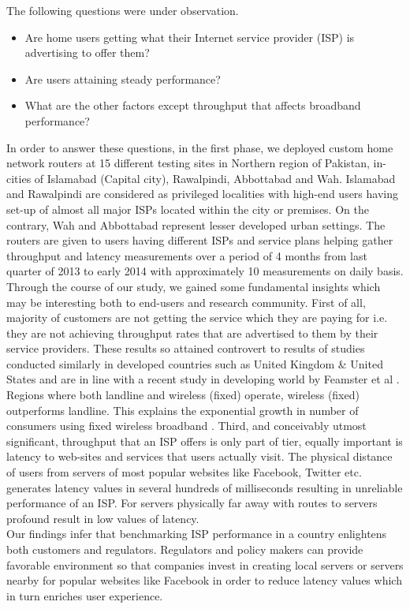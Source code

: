 \documentclass{sig-alternate-10pt}
\begin{document}
\indent The following questions were under observation.
\begin{itemize}
  \item Are home users getting what their Internet service provider (ISP) is advertising to offer them?
  \item Are users attaining steady performance?
  \item What are the other factors except throughput that affects broadband performance?
\end{itemize}
\indent In order to answer these questions, in the first phase, we deployed custom home network routers at 15 different testing sites in Northern region of Pakistan, in-cities of Islamabad (Capital city), Rawalpindi, Abbottabad and Wah. Islamabad and Rawalpindi are considered as privileged localities with high-end users having set-up of almost all major ISPs located within the city or premises. On the contrary, Wah and Abbottabad represent lesser developed urban settings. The routers are given to users having different ISPs and service plans helping gather throughput and latency measurements over a period of 4 months from last quarter of 2013 to early 2014 with approximately 10 measurements on daily basis. \\
\indent Through the course of our study, we gained some fundamental insights which may be interesting both to end-users and research community. First of all, majority of customers are not getting the service which they are paying for i.e. they are not achieving throughput rates that are advertised to them by their service providers. These results so attained controvert to results of studies conducted similarly in developed countries such as United Kingdom \& United States \cite{16} and are in line with a recent study in developing world by Feamster et al \cite{26}. Regions where both landline and wireless (fixed) operate, wireless (fixed) outperforms landline. This explains the exponential growth in number of consumers using fixed wireless broadband \cite{28}. Third, and conceivably utmost significant, throughput that an ISP offers is only part of tier, equally important is latency to web-sites and services that users actually visit.  The physical distance of users from servers of most popular websites like Facebook, Twitter etc. generates latency values in several hundreds of milliseconds resulting in unreliable performance of an ISP. For servers physically far away with routes to servers profound result in low values of latency.\\
\indent Our findings infer that benchmarking ISP performance in a country enlightens both customers and regulators. Regulators and policy makers can provide favorable environment so that companies invest in creating local servers or servers nearby for popular websites like Facebook in order to reduce latency values which in turn enriches user experience.\\
\end{document}
